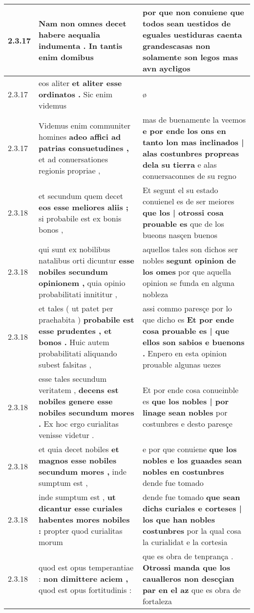 \begin{tabular}{|p{1cm}|p{6.5cm}|p{6.5cm}|}
2.3.17 & Nam non omnes decet \textbf{ habere aequalia indumenta . } In tantis enim domibus & por que non conuiene que todos sean uestidos \textbf{ de eguales uestiduras caenta } grandescasas non solamente son legos mas avn aycłigos \\\hline
2.3.17 & eos aliter \textbf{ et aliter esse ordinatos . } Sic enim videmus & ø \\\hline
2.3.17 & Videmus enim communiter homines \textbf{ adeo affici ad patrias consuetudines , } et ad conuersationes regionis propriae , & mas de buenamente la veemos \textbf{ e por ende los ons en tanto lon mas inclinados | alas costunbres propreas dela su tierra } e alas conuersaconnes de su regno \\\hline
2.3.18 & et secundum quem decet \textbf{ eos esse meliores aliis ; } si probabile est ex bonis bonos , & Et segunt el su estado conuienel es de ser meiores \textbf{ que los | otrossi cosa prouable es } que de los bueons nasçen buenos \\\hline
2.3.18 & qui sunt ex nobilibus natalibus orti dicuntur \textbf{ esse nobiles secundum opinionem , } quia opinio probabilitati innititur , & aquellos tales son dichos ser nobles \textbf{ segunt opinion de los omes } por que aquella opinion se funda en alguna nobleza \\\hline
2.3.18 & et tales ( ut patet per praehabita ) \textbf{ probabile est esse prudentes , et bonos . } Huic autem probabilitati aliquando subest falsitas , & assi commo paresçe por lo que dicho es \textbf{ Et por ende cosa prouable es | que ellos son sabios e buenons . } Enpero en esta opinion prouable algunas uezes \\\hline
2.3.18 & esse tales secundum veritatem , \textbf{ decens est nobiles genere esse nobiles secundum mores . } Ex hoc ergo curialitas venisse videtur . & Et por ende cosa conueinble es \textbf{ que los nobles | por linage sean nobles } por costunbres e desto paresçe \\\hline
2.3.18 & et quia decet nobiles \textbf{ et magnos esse nobiles secundum mores , } inde sumptum est , & e por que conuiene \textbf{ que los nobles e los guaades sean nobles en costunbres } dende fue tomado \\\hline
2.3.18 & inde sumptum est , \textbf{ ut dicantur esse curiales habentes mores nobiles : } propter quod curialitas morum & dende fue tomado \textbf{ que sean dichs curiales e corteses | los que han nobles costunbres } por la qual cosa la curialidat e la cortesia \\\hline
2.3.18 & quod est opus temperantiae : \textbf{ non dimittere aciem , } quod est opus fortitudinis : & que es obra de tenprança . \textbf{ Otrossi manda que los caualleros non descçian par en el az } que es obra de fortaleza \\\hline

\end{tabular}
